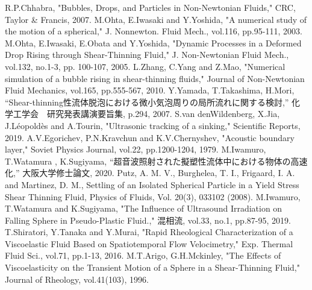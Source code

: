 \begin{thebibliography}{99}
     R.P.Chhabra, "Bubbles, Drops, and Particles in Non-Newtonian Fluids," CRC, Taylor \& Francis, 2007.
     M.Ohta, E.Iwasaki and Y.Yoshida, "A numerical study of the motion of a spherical," J. Nonnewton. Fluid Mech., vol.116, pp.95-111, 2003.
     M.Ohta, E.Iwasaki, E.Obata and Y.Yoshida, "Dynamic Processes in a Deformed Drop Rising through Shear-Thinning Fluid," J. Non-Newtonian Fluid Mech., vol.132, no.1-3, pp. 100-107, 2005.
     L.Zhang, C.Yang and Z.Mao, "Numerical simulation of a bubble rising in shear-thinning fluids," Journal of Non-Newtonian Fluid Mechanics, vol.165, pp.555-567, 2010.
     Y.Yamada, T.Takashima, H.Mori, “Shear-thinning性流体脱泡における微小気泡周りの局所流れに関する検討,” 化学工学会　研究発表講演要旨集, p.294, 2007.
     S.van denWildenberg, X.Jia, J.Léopoldès and A.Tourin, "Ultrasonic tracking of a sinking," Scientific Reports, 2019.
     A.V.Egorichev, P.N.Kravchun and K.V.Chernyshev, "Acoustic boundary layer," Soviet Physics Journal, vol.22, pp.1200-1204, 1979.
     M.Iwamuro, T.Watamura , K.Sugiyama, “超音波照射された擬塑性流体中における物体の高速化,” 大阪大学修士論文, 2020.
     Putz, A. M. V., Burghelea, T. I., Frigaard, I. A. and Martinez, D. M., Settling of an Isolated Spherical Particle in a Yield Stress Shear Thinning Fluid, Physics of Fluids, Vol. 20(3), 033102 (2008).
     M.Iwamuro, T.Watamura and K.Sugiyama, "The Influence of Ultrasound Irradiation on Falling Sphere in Pseudo-Plastic Fluid.," 混相流, vol.33, no.1, pp.87-95, 2019.
     T.Shiratori, Y.Tanaka and Y.Murai, "Rapid Rheological Characterization of a Viscoelastic Fluid Based on Spatiotemporal Flow Velocimetry," Exp. Thermal Fluid Sci., vol.71, pp.1-13, 2016.
     M.T.Arigo, G.H.Mckinley, "The Effects of Viscoelasticity on the Transient Motion of a Sphere in a Shear-Thinning Fluid," Journal of Rheology, vol.41(103), 1996.
\end{thebibliography}
